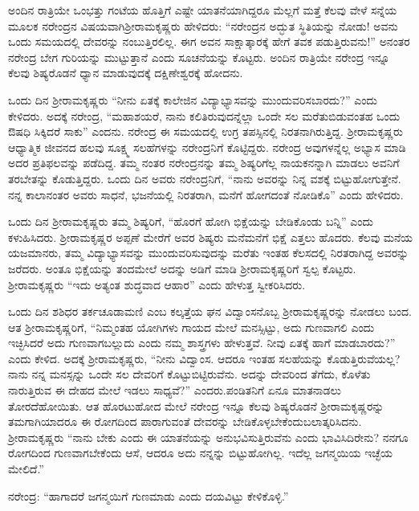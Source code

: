 ಅಂದಿನ ರಾತ್ರಿಯೇ ಒಂಭತ್ತು ಗಂಟೆಯ ಹೊತ್ತಿಗೆ ಎಷ್ಟೇ ಯಾತನೆಯಾಗಿದ್ದರೂ ಮೆಲ್ಲಗೆ ಮತ್ತೆ ಕೆಲವು ವೇಳೆ ಸನ್ನೆಯ ಮೂಲಕ ನರೇಂದ್ರನ ವಿಷಯವಾಗಿ\break ಶ‍್ರೀರಾಮಕೃಷ್ಣರು ಹೇಳಿದರು: “ನರೇಂದ್ರನ ಅದ್ಭುತ ಸ್ಥಿತಿಯನ್ನು ನೋಡು! ಅವನು ಒಂದು ಸಮಯದಲ್ಲಿ ದೇವರನ್ನು ನಂಬುತ್ತಿರಲಿಲ್ಲ. ಈಗ ಅವನ ಸಾಕ್ಷಾತ್ಕಾರಕ್ಕೆ ಹೇಗೆ ತವಕ ಪಡುತ್ತಿರುವನು!” ಅನಂತರ ನರೇಂದ್ರ ಬೇಗ ಗುರಿಯನ್ನು ಮುಟ್ಟುತ್ತಾನೆ ಎಂದು ಸೂಚನೆಯನ್ನು ಕೊಟ್ಟರು. ಅಂದಿನ ರಾತ್ರಿಯೇ ನರೇಂದ್ರ ಇನ್ನೂ ಕೆಲವು ಶಿಷ್ಯರೊಡನೆ ಧ್ಯಾನ ಮಾಡುವುದಕ್ಕೆ ದಕ್ಷಿಣೇಶ್ವರಕ್ಕೆ ಹೋದನು.

ಒಂದು ದಿನ ಶ‍್ರೀರಾಮಕೃಷ್ಣರು “ನೀನು ಏತಕ್ಕೆ ಕಾಲೇಜಿನ ವಿದ್ಯಾಭ್ಯಾಸವನ್ನು ಮುಂದುವರಿಸಬಾರದು?” ಎಂದು ಕೇಳಿದರು. ಅದಕ್ಕೆ ನರೇಂದ್ರ, “ಮಹಾಶಯರೆ, ನಾನು ಕಲಿತಿರುವುದನ್ನೆಲ್ಲಾ ಒಂದೇ ಸಲ ಮರೆತುಬಿಡುವಂತಹ ಒಂದು ಔಷಧಿ ಸಿಕ್ಕಿದರೆ ಸಾಕು” ಎಂದನು. ನರೇಂದ್ರ ಈ ಸಮಯದಲ್ಲಿ ಉಗ್ರ ತಪಸ್ಸಿನಲ್ಲಿ ನಿರತನಾಗಿರುತ್ತಿದ್ದ. ಶ‍್ರೀರಾಮಕೃಷ್ಣರು ಆಧ್ಯಾತ್ಮಿಕ ಜೀವನದ ಹಲವು ಸೂಕ್ಷ್ಮ ಸಲಹೆಗಳನ್ನು ನರೇಂದ್ರನಿಗೆ ಕೊಟ್ಟಿದ್ದರು. ನರೇಂದ್ರ ಅವುಗಳನ್ನೆಲ್ಲ ಅಭ್ಯಾಸ ಮಾಡಿ ಅದರ ಪ್ರತಿಫಲವನ್ನು ಪಡೆದಿದ್ದ. ತಮ್ಮ ನಂತರ ನರೇಂದ್ರನನ್ನು ತಮ್ಮ ಶಿಷ್ಯರಿಗೆಲ್ಲ ನಾಯಕನನ್ನಾಗಿ ಮಾಡಲು ಅವನಿಗೆ ತರಬೇತನ್ನು ಕೊಡುತ್ತಿದ್ದರು. ಒಂದು ದಿನ ಅವರು ನರೇಂದ್ರನಿಗೆ, “ನಾನು ಅವರನ್ನು ನಿನ್ನ ವಶಕ್ಕೆ ಬಿಟ್ಟುಹೋಗುತ್ತೇನೆ. ನನ್ನ ಕಾಲಾನಂತರ ಅವರು ಸಾಧನೆ, ಭಜನೆಯಲ್ಲಿ ನಿರತರಾಗಿ, ಮನೆಗೆ ಹೋಗದಂತೆ ನೋಡಿಕೊ” ಎಂದು ಹೇಳಿದರು.

ಒಂದು ದಿನ ಶ‍್ರೀರಾಮಕೃಷ್ಣರು ತಮ್ಮ ಶಿಷ್ಯರಿಗೆ, “ಹೊರಗೆ ಹೋಗಿ ಭಿಕ್ಷೆಯನ್ನು ಬೇಡಿಕೊಂಡು ಬನ್ನಿ” ಎಂದು ಕಳುಹಿಸಿದರು. ಶ‍್ರೀರಾಮಕೃಷ್ಣರ ಅಪ್ಪಣೆ ಮೇರೆಗೆ ಅವರ ಶಿಷ್ಯರು ಮನೆಮನೆಗೆ ಭಿಕ್ಷೆ ಎತ್ತಲು ಹೊದರು. ಕೆಲವು ಮನೆಯ ಯಜಮಾನರು, ತಮ್ಮ ವಿದ್ಯಾಭ್ಯಾಸವನ್ನು ಮುಂದುವರಿಸುವುದನ್ನು ಮರೆತು ಇಂತಹ ಕೆಲಸದಲ್ಲಿ ನಿರತರಾಗಿದ್ದ ಅವರನ್ನು ಜರೆದರು. ಅಂತೂ ಭಿಕ್ಷೆಯನ್ನು ತಂದಮೇಲೆ ಅದನ್ನು ಅಡಿಗೆ ಮಾಡಿ ಶ‍್ರೀರಾಮಕೃಷ್ಣರಿಗೆ ಸ್ವಲ್ಪ ಕೊಟ್ಟರು. ಶ‍್ರೀರಾಮಕೃಷ್ಣರು “ಇದು ಅತ್ಯಂತ ಶುದ್ಧವಾದ ಆಹಾರ” ಎಂದು ಹೇಳುತ್ತ ಸ್ವೀಕರಿಸಿದರು.

ಒಂದು ದಿನ ಶಶಿಧರ ತರ್ಕಚೂಡಾಮಣಿ ಎಂಬ ಕಲ್ಕತ್ತೆಯ ಘನ ವಿದ್ವಾಂಸನೊಬ್ಬ ಶ‍್ರೀರಾಮಕೃಷ್ಣರನ್ನು ನೋಡಲು ಬಂದ. ಆತ ಶ‍್ರೀರಾಮಕೃಷ್ಣರಿಗೆ, “ನಿಮ್ಮಂತಹ ಯೋಗಿಗಳು ಗಾಯದ ಮೇಲೆ ಮನಸ್ಸಿಟ್ಟು, ಅದು ಗುಣವಾಗಲಿ ಎಂದು ಇಚ್ಛಿಸಿದರೆ ಅದು ಗುಣವಾಗಬಲ್ಲುದು ಎಂದು ನಮ್ಮ ಶಾಸ್ತ್ರಗಳು ಹೇಳುತ್ತವೆ. ನೀವು ಏತಕ್ಕೆ ಹಾಗೆ ಮಾಡಬಾರದು?” ಎಂದು ಕೇಳಿದ. ಅದಕ್ಕೆ ಶ‍್ರೀರಾಮಕೃಷ್ಣರು, “ನೀನು ವಿದ್ವಾಂಸ. ಆದರೂ ಇಂತಹ ಸಲಹೆಯನ್ನು ಕೊಡುತ್ತಿರುವೆಯಲ್ಲ? ನಾನು ನನ್ನ ಮನಸ್ಸನ್ನು ಒಂದೇ ಸಲ ದೇವರಿಗೆ ಕೊಟ್ಟುಬಿಟ್ಟಿರುವೆನು. ಅದನ್ನು ದೇವರಿಂದ ತೆಗೆದು, ಕೊಳೆತು ನಾರುತ್ತಿರುವ ಈ ದೇಹದ ಮೇಲೆ ಇಡಲು ಸಾಧ್ಯವೆ?” ಎಂದರು.\break ಪಂಡಿತನಿಗೆ ಏನೂ ಮಾತನಾಡಲು ತೋರದೆಹೋಯಿತು. ಆತ ಹೊರಟುಹೋದ ಮೇಲೆ ನರೇಂದ್ರ ಇನ್ನೂ ಕೆಲವು ಶಿಷ್ಯರೊಡನೆ ಶ‍್ರೀರಾಮಕೃಷ್ಣರನ್ನು ತಮಗಾಗಿಯಾದರೂ ಈ ರೋಗದಿಂದ ಪಾರಾಗುವಂತೆ ದೇವರನ್ನು ಬೇಡಿಕೊಳ್ಳಬೇಕೆಂದು\break ಬಲಾತ್ಕರಿಸಿದನು. ಶ‍್ರೀರಾಮಕೃಷ್ಣರು “ನಾನು ಬೇಕು ಎಂದು ಈ ಯಾತನೆಯನ್ನು ಅನುಭವಿಸುತ್ತಿರುವೆನು ಎಂದು ಭಾವಿಸಿದಿರೇನು? ನನಗೂ ರೋಗದಿಂದ ಗುಣವಾಗಬೇಕೆಂದು ಆಸೆ, ಆದರೂ ಅದು ನನ್ನನ್ನು ಬಿಟ್ಟುಹೋಗಿಲ್ಲ. ಇದೆಲ್ಲ ಜಗನ್ಮಯಿಯ ಇಚ್ಛೆಯ ಮೇಲಿದೆ.”

ನರೇಂದ್ರ: “ಹಾಗಾದರೆ ಜಗನ್ಮಯಿಗೆ ಗುಣಮಾಡು ಎಂದು ದಯವಿಟ್ಟು ಕೇಳಿಕೊಳ್ಳಿ.”

